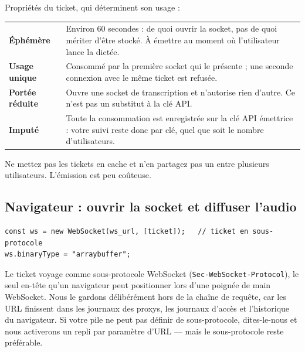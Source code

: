 \documentclass[11pt,a4paper]{article}
\begin{document}
\noindent Propriétés du ticket, qui déterminent son usage :

\begin{center}
\renewcommand{\arraystretch}{1.35}
\begin{tabular}{@{}>{\bfseries}p{3.4cm}p{10.9cm}@{}}
\toprule
Éphémère      & Environ 60 secondes : de quoi ouvrir la socket, pas de quoi mériter
                d'être stocké. À émettre au moment où l'utilisateur lance la dictée. \\
Usage unique  & Consommé par la première socket qui le présente ; une seconde connexion
                avec le même ticket est refusée. \\
Portée réduite & Ouvre une socket de transcription et n'autorise rien d'autre. Ce n'est
                pas un substitut à la clé API. \\
Imputé        & Toute la consommation est enregistrée sur la clé API émettrice : votre
                suivi reste donc par clé, quel que soit le nombre d'utilisateurs. \\
\bottomrule
\end{tabular}
\end{center}

\noindent Ne mettez pas les tickets en cache et n'en partagez pas un entre plusieurs
utilisateurs. L'émission est peu coûteuse.

\subsection{Navigateur : ouvrir la socket et diffuser l'audio}

\begin{lstlisting}
const ws = new WebSocket(ws_url, [ticket]);   // ticket en sous-protocole
ws.binaryType = "arraybuffer";
\end{lstlisting}

Le ticket voyage comme sous-protocole WebSocket (\texttt{Sec-WebSocket-Protocol}), le seul
en-tête qu'un navigateur peut positionner lors d'une poignée de main WebSocket. Nous le
gardons délibérément hors de la chaîne de requête, car les URL finissent dans les journaux
des proxys, les journaux d'accès et l'historique du navigateur. Si votre pile ne peut pas
définir de sous-protocole, dites-le-nous et nous activerons un repli par paramètre
d'URL — mais le sous-protocole reste préférable.
\end{document}
